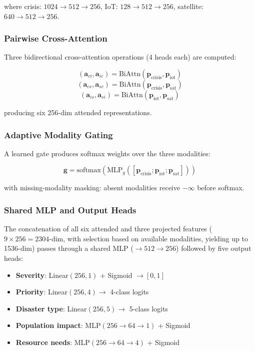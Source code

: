 \documentclass[journal]{IEEEtran}
\begin{document}
where crisis: $1024 \to 512 \to 256$, IoT: $128 \to 512 \to 256$, satellite: $640 \to 512 \to 256$.

\subsubsection{Pairwise Cross-Attention}

Three bidirectional cross-attention operations (4 heads each) are computed:

\begin{equation}
(\mathbf{a}_{ci}, \mathbf{a}_{ic}) = \text{BiAttn}(\mathbf{p}_\text{crisis}, \mathbf{p}_\text{iot})
\end{equation}
\begin{equation}
(\mathbf{a}_{cs}, \mathbf{a}_{sc}) = \text{BiAttn}(\mathbf{p}_\text{crisis}, \mathbf{p}_\text{sat})
\end{equation}
\begin{equation}
(\mathbf{a}_{is}, \mathbf{a}_{si}) = \text{BiAttn}(\mathbf{p}_\text{iot}, \mathbf{p}_\text{sat})
\end{equation}

producing six 256-dim attended representations.

\subsubsection{Adaptive Modality Gating}

A learned gate produces softmax weights over the three modalities:

\begin{equation}
\mathbf{g} = \text{softmax}(\text{MLP}_g([\mathbf{p}_\text{crisis}; \mathbf{p}_\text{iot}; \mathbf{p}_\text{sat}]))
\end{equation}

with missing-modality masking: absent modalities receive $-\infty$ before softmax.

\subsubsection{Shared MLP and Output Heads}

The concatenation of all six attended and three projected features ($9 \times 256 = 2304$-dim, with selection based on available modalities, yielding up to 1536-dim) passes through a shared MLP ($\to 512 \to 256$) followed by five output heads:

\begin{itemize}
    \item \textbf{Severity}: Linear$(256,1)$ + Sigmoid $\to [0,1]$
    \item \textbf{Priority}: Linear$(256,4) \to$ 4-class logits
    \item \textbf{Disaster type}: Linear$(256,5) \to$ 5-class logits
    \item \textbf{Population impact}: MLP$(256 \to 64 \to 1)$ + Sigmoid
    \item \textbf{Resource needs}: MLP$(256 \to 64 \to 4)$ + Sigmoid
\end{itemize}
\end{document}
